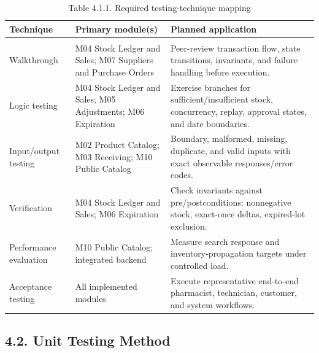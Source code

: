 {\def\LTcaptype{none} %
\begin{longtable}[]{|
  >{\raggedright\arraybackslash}m{}|
  >{\raggedright\arraybackslash}m{}|
  >{\raggedright\arraybackslash}m{}|}
\hline
\begin{minipage}[c]{\linewidth}\raggedright
\textbf{Technique}
\end{minipage} & \begin{minipage}[c]{\linewidth}\raggedright
\textbf{Primary module(s)}
\end{minipage} & \begin{minipage}[c]{\linewidth}\raggedright
\textbf{Planned application}
\end{minipage} \\
\hline
\endhead

\caption*{Table 4.1.1. Required testing-technique mapping}\\
\endlastfoot
Walkthrough & M04 Stock Ledger and Sales; M07 Suppliers and Purchase Orders & Peer-review transaction flow, state transitions, invariants, and failure handling before execution. \\ \hline
Logic testing & M04 Stock Ledger and Sales; M05 Adjustments; M06 Expiration & Exercise branches for sufficient/insufficient stock, concurrency, replay, approval states, and date boundaries. \\ \hline
Input/output testing & M02 Product Catalog; M03 Receiving; M10 Public Catalog & Boundary, malformed, missing, duplicate, and valid inputs with exact observable responses/error codes. \\ \hline
Verification & M04 Stock Ledger and Sales; M06 Expiration & Check invariants against pre/postconditions: nonnegative stock, exact-once deltas, expired-lot exclusion. \\ \hline
Performance evaluation & M10 Public Catalog; integrated backend & Measure search response and inventory-propagation targets under controlled load. \\ \hline
Acceptance testing & All implemented modules & Execute representative end-to-end pharmacist, technician, customer, and system workflows. \\ \hline
\end{longtable}
}

\subsection{4.2. Unit Testing Method}\label{unit-testing-method}


